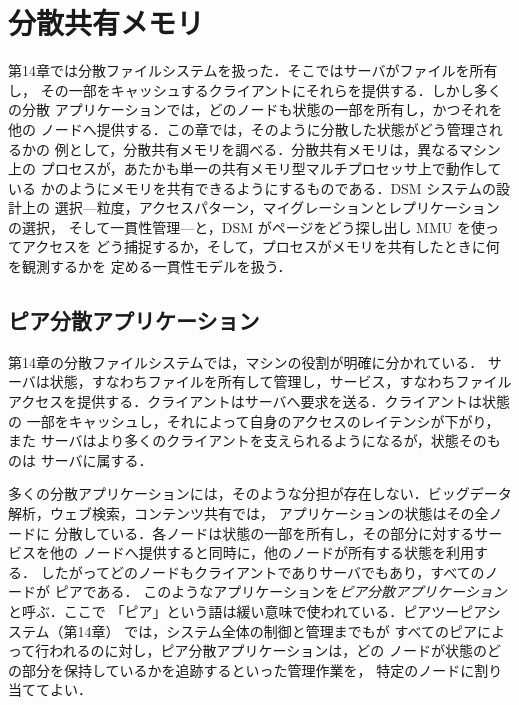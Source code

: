 \documentclass[../main.tex]{subfiles}
\begin{document}
\chapter{分散共有メモリ}

第14章では分散ファイルシステムを扱った．そこではサーバがファイルを所有し，
その一部をキャッシュするクライアントにそれらを提供する．しかし多くの分散
アプリケーションでは，どのノードも状態の一部を所有し，かつそれを他の
ノードへ提供する．この章では，そのように分散した状態がどう管理されるかの
例として，分散共有メモリを調べる．分散共有メモリは，異なるマシン上の
プロセスが，あたかも単一の共有メモリ型マルチプロセッサ上で動作している
かのようにメモリを共有できるようにするものである．DSM システムの設計上の
選択---粒度，アクセスパターン，マイグレーションとレプリケーションの選択，
そして一貫性管理---と，DSM がページをどう探し出し MMU を使ってアクセスを
どう捕捉するか，そして，プロセスがメモリを共有したときに何を観測するかを
定める一貫性モデルを扱う．

\section{ピア分散アプリケーション}
\label{sec:l15-peer}

第14章の分散ファイルシステムでは，マシンの役割が明確に分かれている．
サーバは状態，すなわちファイルを所有して管理し，サービス，すなわちファイル
アクセスを提供する．クライアントはサーバへ要求を送る．クライアントは状態の
一部をキャッシュし，それによって自身のアクセスのレイテンシが下がり，また
サーバはより多くのクライアントを支えられるようになるが，状態そのものは
サーバに属する．

多くの分散アプリケーションには，そのような分担が存在しない．ビッグデータ
解析，ウェブ検索，コンテンツ共有では，%
アプリケーションの状態はその全ノードに
分散している．各ノードは状態の一部を所有し，その部分に対するサービスを他の
ノードへ提供すると同時に，他のノードが所有する状態を利用する．
したがってどのノードもクライアントでありサーバでもあり，すべてのノードが
ピアである．
このようなアプリケーションを\emph{ピア分散アプリケーション}と呼ぶ．ここで
「ピア」という語は緩い意味で使われている．ピアツーピアシステム（第14章）
では，システム全体の制御と管理までもが
すべてのピアによって行われるのに対し，ピア分散アプリケーションは，どの
ノードが状態のどの部分を保持しているかを追跡するといった管理作業を，
特定のノードに割り当ててよい．
\end{document}
